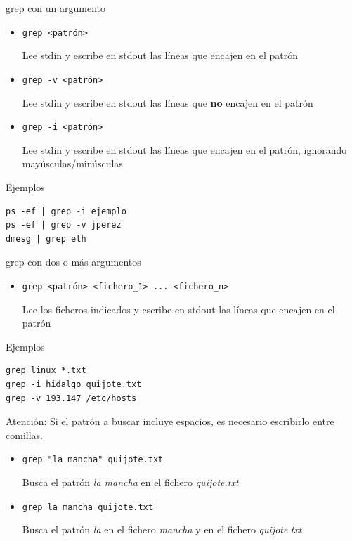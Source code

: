 \documentclass[ucs]{beamer}
\begin{document}
\begin{frame}[fragile]

grep con un argumento
\begin{itemize} 
\item
\verb|grep <patrón> | 

Lee stdin y escribe en stdout las líneas que encajen en el patrón
\item
\verb|grep -v <patrón> | 

Lee stdin y escribe en stdout las líneas que \textbf{no} encajen en el patrón
\item
\verb|grep -i <patrón> | 

Lee stdin y escribe en stdout las líneas que encajen en el patrón, ignorando mayúsculas/minúsculas

\end{itemize} 


Ejemplos
  \begin{footnotesize}
  \begin{verbatim}
ps -ef | grep -i ejemplo
ps -ef | grep -v jperez
dmesg | grep eth
  \end{verbatim}
  \end{footnotesize}

\end{frame}
\begin{frame}[fragile]

grep con dos o más argumentos

\begin{itemize} 
\item
\verb|grep <patrón> <fichero_1> ... <fichero_n> | 

Lee los ficheros 
indicados
y escribe en stdout las líneas que encajen
en el patrón
\end{itemize}



Ejemplos
  \begin{footnotesize}
  \begin{verbatim}
grep linux *.txt
grep -i hidalgo quijote.txt
grep -v 193.147 /etc/hosts
  \end{verbatim}
  \end{footnotesize}

Atención: Si el patrón a buscar incluye espacios, es necesario escribirlo entre comillas.
  \begin{footnotesize}
\begin{itemize} 
\item 
\verb|grep "la mancha" quijote.txt  |  

Busca el patrón \emph{la mancha} en el fichero \emph{quijote.txt}
\item 
\verb|grep la mancha quijote.txt  |  

Busca el patrón \emph{la} en el fichero \emph{mancha} y en el fichero \emph{quijote.txt} 

\end{itemize}
  \end{footnotesize}

\end{frame}
\end{document}

